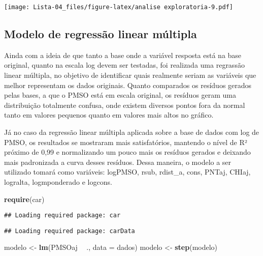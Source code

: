 \documentclass[
]{article}
\newenvironment{Shaded}{\begin{snugshade}}{\end{snugshade}}
\newcommand{\DataTypeTok}[1]{\textcolor[rgb]{0.13,0.29,0.53}{#1}}
\newcommand{\KeywordTok}[1]{\textcolor[rgb]{0.13,0.29,0.53}{\textbf{#1}}}
\newcommand{\NormalTok}[1]{#1}
\newcommand{\OperatorTok}[1]{\textcolor[rgb]{0.81,0.36,0.00}{\textbf{#1}}}
\newcommand{\StringTok}[1]{\textcolor[rgb]{0.31,0.60,0.02}{#1}}
\begin{document}
\texttt{[image: Lista-04\_files/figure-latex/analise exploratoria-9.pdf]}

\hypertarget{modelo-de-regressuxe3o-linear-muxfaltipla}{%
\subsection{Modelo de regressão linear
múltipla}\label{modelo-de-regressuxe3o-linear-muxfaltipla}}

Ainda com a ideia de que tanto a base onde a variável resposta está na
base original, quanto na escala log devem ser testadas, foi realizada
uma regrassão linear múltipla, no objetivo de identificar quais
realmente seriam as variáveis que melhor representam os dados originais.
Quanto comparados os resíduos gerados pelas bases, a que o PMSO está em
escala original, os resíduos geram uma distribuição totalmente confusa,
onde existem diversos pontos fora da normal tanto em valores pequenos
quanto em valores mais altos no gráfico.

Já no caso da regressão linear múltipla aplicada sobre a base de dados
com log de PMSO, os resultados se mostraram mais satisfatórios, mantendo
o nível de R² próximo de 0,99 e normalizando um pouco mais os resíduos
gerados e deixando mais padronizada a curva desses resíduos. Dessa
maneira, o modelo a ser utilizado tomará como variáveis: logPMSO, rsub,
rdist\_a, cons, PNTaj, CHIaj, logralta, logmponderado e logcons.

\begin{Shaded}
\begin{Highlighting}[]
\KeywordTok{require}\NormalTok{(car)}
\end{Highlighting}
\end{Shaded}

\begin{verbatim}
## Loading required package: car
\end{verbatim}

\begin{verbatim}
## Loading required package: carData
\end{verbatim}

\begin{Shaded}
\begin{Highlighting}[]
\NormalTok{modelo <-}\StringTok{ }\KeywordTok{lm}\NormalTok{(PMSOaj }\OperatorTok{~}\StringTok{ }\NormalTok{., }\DataTypeTok{data =}\NormalTok{ dados)}
\NormalTok{modelo <-}\StringTok{ }\KeywordTok{step}\NormalTok{(modelo)}
\end{Highlighting}
\end{Shaded}
\end{document}
